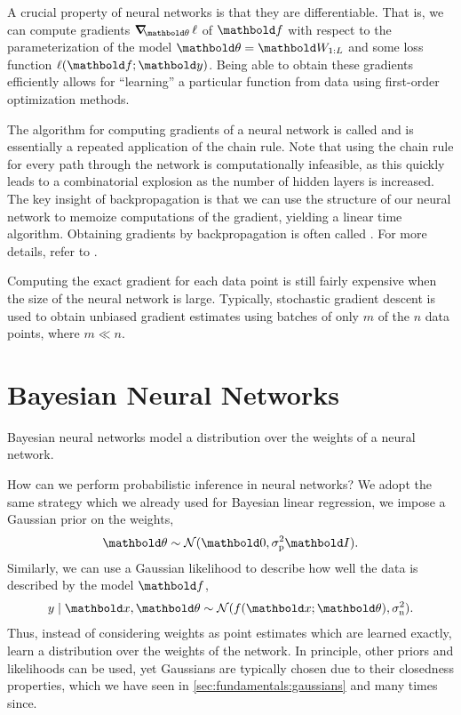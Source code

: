 A crucial property of neural networks is that they are differentiable.
That is, we can compute gradients $\grad_\vtheta \ell$ of $\vf$ with respect to the parameterization of the model $\vtheta = \mW_{1:L}$ and some loss function $\ell(\vf; \vy)$.
Being able to obtain these gradients efficiently allows for ``learning'' a particular function from data using first-order optimization methods.

The algorithm for computing gradients of a neural network is called  and is essentially a repeated application of the chain rule.
Note that using the chain rule for every path through the network is computationally infeasible, as this quickly leads to a combinatorial explosion as the number of hidden layers is increased.
The key insight of backpropagation is that we can use the  structure of our neural network to memoize computations of the gradient, yielding a linear time algorithm.
Obtaining gradients by backpropagation is often called .
For more details, refer to \cite{goodfellow2016deep}.

Computing the exact gradient for each data point is still fairly expensive when the size of the neural network is large.
Typically, stochastic gradient descent is used to obtain unbiased gradient estimates using batches of only $m$ of the $n$ data points, where $m \ll n$.

\section{Bayesian Neural Networks}

\begin{marginfigure}[5\baselineskip]
  \caption{Bayesian neural networks model a distribution over the weights of a neural network.}
\end{marginfigure}

How can we perform probabilistic inference in neural networks? We adopt the same strategy which we already used for Bayesian linear regression, we impose a Gaussian prior on the weights, \begin{align}
  \vtheta \sim \N{\vzero}{\sigmap^2 \mI}.
\end{align}
Similarly, we can use a Gaussian likelihood to describe how well the data is described by the model $\vf$, \begin{align}
  y \mid \vx, \vtheta \sim \N{f(\vx; \vtheta)}{\sigman^2}. \label{eq:bnn_likelihood}
\end{align}
Thus, instead of considering weights as point estimates which are learned exactly,  learn a distribution over the weights of the network.
In principle, other priors and likelihoods can be used, yet Gaussians are typically chosen due to their closedness properties, which we have seen in \cref{sec:fundamentals:gaussians} and many times since.

